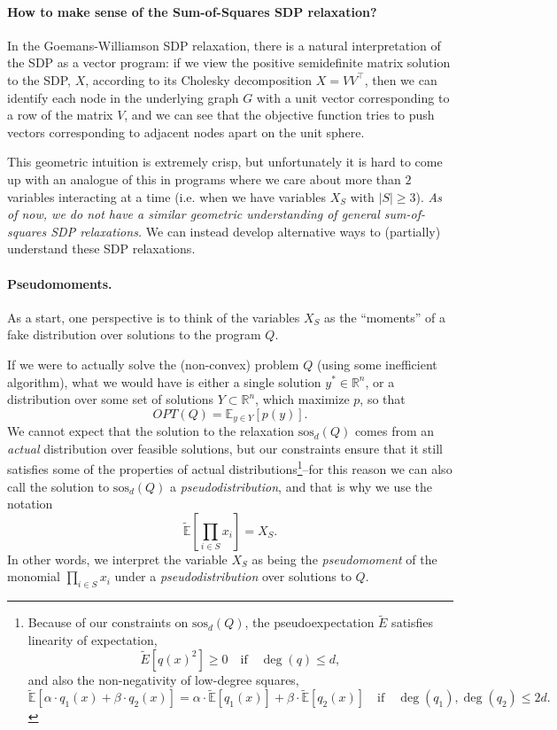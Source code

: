 \documentclass[a4paper,11pt]{article}
\newcommand{\R}{\mathbb{R}}
\newcommand{\E}{\mathbb{E}}
\newcommand{\sos}{\mathrm{sos}}
\theoremstyle{definition}
\begin{document}
\paragraph{How to make sense of the Sum-of-Squares SDP relaxation?}
In the Goemans-Williamson SDP relaxation, there is a natural interpretation of the SDP as a vector program: if we view the positive semidefinite matrix solution to the SDP, $X$, according to its Cholesky decomposition $X = VV^{\top}$, then we can identify each node in the underlying graph $G$ with a unit vector corresponding to a row of the matrix $V$, and we can see that the objective function tries to push vectors corresponding to adjacent nodes apart on the unit sphere.

This geometric intuition is extremely crisp, but unfortunately it is hard to come up with an analogue of this in programs where we care about more than $2$ variables interacting at a time (i.e. when we have variables $X_S$ with $|S| \ge 3$).
{\em As of now, we do not have a similar geometric understanding of general sum-of-squares SDP relaxations.}
We can instead develop alternative ways to (partially) understand these SDP relaxations.


\paragraph{Pseudomoments.}
As a start, one perspective is to think of the variables $X_S$ as the ``moments'' of a fake distribution over solutions to the program $Q$.

If we were to actually solve the (non-convex) problem $Q$ (using some inefficient algorithm), what we would have is either a single solution $y^*\in \R^n$, or a distribution over some set of solutions $Y\subset \R^n$, which maximize $p$, so that
\[
OPT(Q) = \E_{y \in Y} [p(y)].
\]
We cannot expect that the solution to the relaxation $\sos_d(Q)$ comes from an {\em actual} distribution over feasible solutions, but our constraints ensure that it still satisfies some of the properties of actual distributions\footnote{
Because of our constraints on $\sos_d(Q)$, the pseudoexpectation $\tilde{E}$ satisfies linearity of expectation,
\[
\tilde{E}[q(x)^2] \ge 0 \quad \text{if} \quad \deg(q)\le d,
\]
and also the non-negativity of low-degree squares,
\[
\tilde{\E}[\alpha\cdot q_1(x) + \beta \cdot q_2(x)] = \alpha \cdot \tilde{\E}[q_1(x)] + \beta \cdot \tilde{\E}[q_2(x)]\quad \text{if} \quad \deg(q_1),\deg(q_2) \le 2d.
\]

}--for this reason we can also call the solution to $\sos_d(Q)$ a {\em pseudodistribution}, and that is why we use the notation
\[
\tilde{\E}\left[\prod_{i\in S} x_i \right] = X_S.
\]
In other words, we interpret the variable $X_S$ as being the {\em pseudomoment} of the monomial $\prod_{i\in S} x_i$ under a {\em pseudodistribution} over solutions to $Q$.
\end{document}
